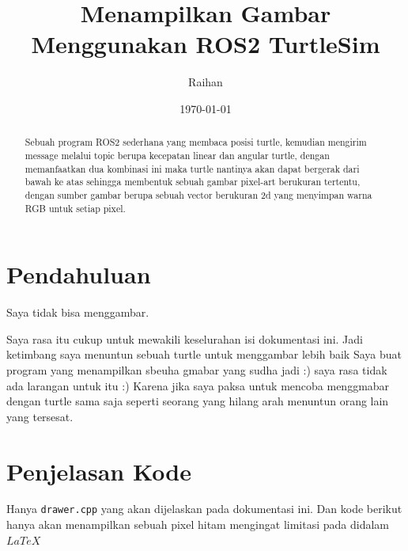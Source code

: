 \documentclass{article}
\title{Menampilkan Gambar Menggunakan ROS2 TurtleSim}
\author{Raihan}
\date{\today}
\newenvironment{info}
{
    \begin{mdframed}[
        linewidth=2pt,
        linecolor=info_color,
        backgroundcolor=white
    ]
}
{
    \end{mdframed}
}
\begin{document}
\maketitle
\begin{abstract}
    Sebuah program ROS2 sederhana yang membaca posisi turtle, kemudian 
    mengirim message melalui topic berupa kecepatan linear dan angular turtle,
     dengan memanfaatkan dua kombinasi ini maka turtle nantinya akan dapat 
     bergerak dari bawah ke atas sehingga membentuk sebuah gambar pixel-art berukuran tertentu, dengan sumber gambar 
     berupa sebuah vector berukuran 2d yang menyimpan warna RGB untuk setiap pixel.
\end{abstract}
\section{Pendahuluan}
\begin{info}
Saya tidak bisa menggambar.
\end{info}
Saya rasa itu cukup untuk mewakili keselurahan isi dokumentasi ini. 
Jadi ketimbang saya menuntun sebuah turtle untuk menggambar lebih baik 
Saya buat program yang menampilkan sbeuha gmabar yang sudha jadi :) saya rasa tidak ada larangan untuk itu :)
Karena jika saya paksa untuk mencoba menggmabar dengan turtle sama saja seperti seorang yang hilang arah menuntun orang lain yang tersesat.
\newpage
\section{Penjelasan Kode}

\begin{info}
Hanya  \verb|drawer.cpp|  yang akan dijelaskan pada dokumentasi ini. Dan kode berikut hanya akan menampilkan sebuah pixel hitam mengingat limitasi pada didalam $LaTeX$
\end{info}
\end{document}
